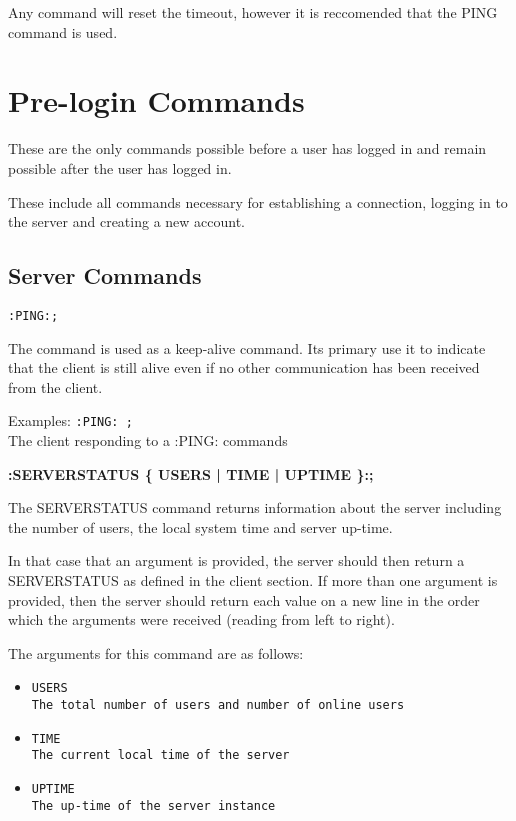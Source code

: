 Any command will reset the timeout, however it is reccomended that the PING command is used.

\section{Pre-login Commands}

These are the only commands possible before a user has logged in and remain possible after the user has logged in.

These include all commands necessary for establishing a connection, logging in to the server and creating a new account.

\subsection{Server Commands}

\texttt{:PING:;}

The command is used as a keep-alive command. Its primary use it to indicate that the client is still alive even if no other communication has been received from the client. 

Examples:
\texttt{:PING: ;} \\
The client responding to a :PING: commands

{\bf :SERVERSTATUS \{ USERS | TIME | UPTIME \}:;}

The SERVERSTATUS command returns information about the server including the number of users, the local system time and server up-time.
 
In that case that an argument is provided, the server should then return a SERVERSTATUS as defined in the client section. If more than one argument is provided, then the server should return each value on a new line in the order which the arguments were received (reading from left to right).

The arguments for this command are as follows:

\begin{itemize}

\item \texttt{USERS \\
The total number of users and number of online users}

\item \texttt{TIME \\
The current local time of the server}

\item \texttt{UPTIME \\
The up-time of the server instance}

\end{itemize}

